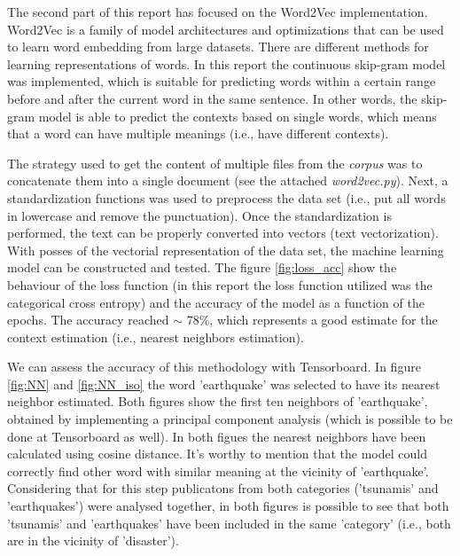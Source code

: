 \documentclass{article}
\begin{document}
The second part of this report has focused on the Word2Vec implementation. Word2Vec is a family of model architectures and optimizations that can be used to learn word embedding from large datasets. There are different methods for learning representations of words. In this report the continuous skip-gram model was implemented, which is suitable for predicting words within a certain range before and after the current word in the same sentence. In other words, the skip-gram model is able to predict the contexts based on single words, which means that a word can have multiple meanings (i.e., have different contexts). 

The strategy used to get the content of multiple files from the \textit{corpus} was to concatenate them into a single document (see the attached \textit{word2vec.py}). Next, a standardization functions was used to preprocess the data set (i.e., put all words in lowercase and remove the punctuation). Once the standardization is performed, the text can be properly converted into vectors (text vectorization). With posses of the vectorial representation of the data set, the machine learning model can be constructed and tested. The figure \ref{fig:loss_acc} show the behaviour of the loss function (in this report the loss function utilized was the categorical cross entropy) and the accuracy of the model as a function of the epochs. The accuracy reached $\sim $ 78\%, which represents a good estimate for the context estimation (i.e., nearest neighbors estimation).

We can assess the accuracy of this methodology with Tensorboard. In figure \ref{fig:NN} and \ref{fig:NN_iso} the word 'earthquake' was selected to have its nearest neighbor estimated. Both figures show the first ten neighbors of 'earthquake', obtained by implementing a principal component analysis (which is possible to be done at Tensorboard as well). In both figues the nearest neighbors have been calculated using cosine distance. It's worthy to mention that the model could correctly find other word with similar meaning at the vicinity of 'earthquake'. Considering that for this step publicatons from both categories ('tsunamis' and 'earthquakes') were analysed together, in both figures is possible to see that both 'tsunamis' and 'earthquakes' have been included in the same 'category' (i.e., both are in the vicinity of 'disaster'). 
\end{document}
